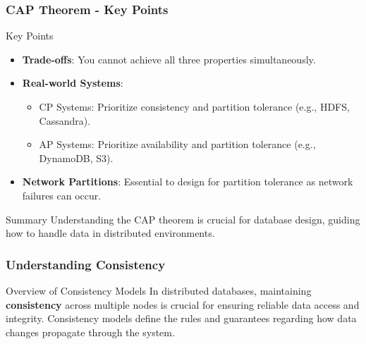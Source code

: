 \documentclass[aspectratio=169]{beamer}
\begin{document}
\begin{frame}[fragile]
    \frametitle{CAP Theorem - Key Points}
    \begin{block}{Key Points}
        \begin{itemize}
            \item \textbf{Trade-offs}: You cannot achieve all three properties simultaneously.
            \item \textbf{Real-world Systems}: 
            \begin{itemize}
                \item CP Systems: Prioritize consistency and partition tolerance (e.g., HDFS, Cassandra).
                \item AP Systems: Prioritize availability and partition tolerance (e.g., DynamoDB, S3).
            \end{itemize}
            \item \textbf{Network Partitions}: Essential to design for partition tolerance as network failures can occur.
        \end{itemize}
    \end{block}
    \begin{block}{Summary}
        Understanding the CAP theorem is crucial for database design, guiding how to handle data in distributed environments.
    \end{block}
\end{frame}

\begin{frame}[fragile]
    \frametitle{Understanding Consistency}
    \begin{block}{Overview of Consistency Models}
        In distributed databases, maintaining \textbf{consistency} across multiple nodes is crucial for ensuring reliable data access and integrity. Consistency models define the rules and guarantees regarding how data changes propagate through the system.
    \end{block}
\end{frame}
\end{document}
